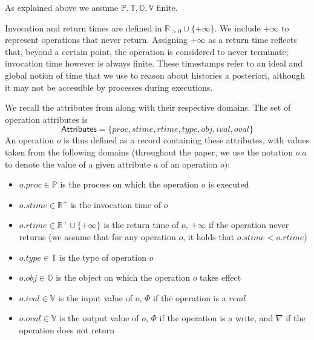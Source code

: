 As explained above we assume $\mathbb{P},\mathbb{T},\mathbb{O},\mathbb{V}$ finite.

Invocation and return times are defined in $\mathbb{R}_{>0}\cup \{+\infty\}$. We include $+\infty$ to represent operations that never return. Assigning $+\infty$ as a return time reflects that, beyond a certain point, the operation is considered to never terminate; invocation time however is always finite.
These timestamps refer to an ideal and global notion of time that we use to reason
about histories a posteriori, although it may not be accessible by processes during executions.

We recall the attributes from \cite{ViottiVukolic} along with their respective domains. The set of operation attributes is 
$$
\mathsf{Attributes} = \{proc, stime, rtime, type, obj, ival, oval\}
$$
An operation $o$ is thus defined as a record containing these attributes, with values taken from the following domains 
(throughout the paper, we use the notation $o.a$ to denote the value of a given attribute $a$ of an operation $o$):

\begin{itemize}
	\item $o.proc\in \mathbb{P}$ is the process on which the operation $o$ is executed
	\item $o.stime\in \mathbb{R}^+$ is the invocation time of $o$
	\item $o.rtime\in \mathbb{R}^+\cup \{+\infty\}$ is the return time of $o$, $+\infty$ if the operation never returns (we assume that for any operation $o$, it holds that $o.stime<o.rtime$)
	\item $o.type\in \mathbb{T}$ is the type of operation $o$
	\item $o.obj\in \mathbb{O}$ is the object on which the operation $o$ takes effect
	\item $o.ival\in \mathbb{V}$ is the input value of $o$, $\Phi$ if the operation is a $read$
	\item $o.oval\in \mathbb{V}$ is the output value of $o$, $\Phi$ if the operation is a write, and $\nabla$ if the operation does not return
\end{itemize}

